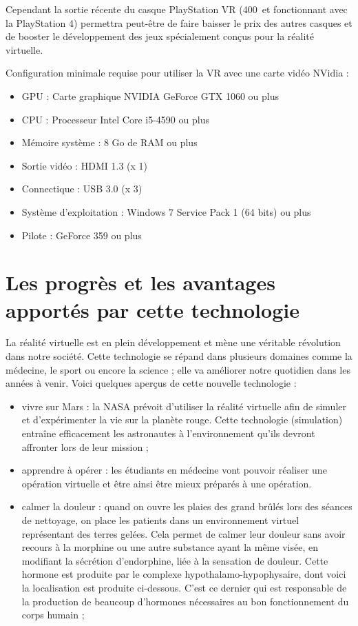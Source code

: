 \documentclass[12pt, a4paper]{report}
\newcommand{\euro}{\,\EUR}
\begin{document}
Cependant la sortie récente du casque PlayStation VR (400 \euro et fonctionnant avec la PlayStation 4) permettra peut-être de faire baisser le prix des autres casques et de booster le développement des jeux spécialement conçus pour la réalité virtuelle.

\vspace{0.5cm}

\noindent Configuration minimale requise pour utiliser la VR avec une carte vidéo NVidia :
\begin{itemize}
\item GPU : Carte graphique NVIDIA GeForce GTX 1060 ou plus
\item CPU : Processeur Intel Core i5-4590 ou plus
\item Mémoire système : 8 Go de RAM ou plus
\item Sortie vidéo : HDMI 1.3 (x 1)
\item Connectique : USB 3.0 (x 3)
\item Système d'exploitation : Windows 7 Service Pack 1 (64 bits) ou plus
\item Pilote : GeForce 359 ou plus
\end{itemize}


\section[Avantages]{Les progrès et les avantages apportés par cette technologie}

La réalité virtuelle est en plein développement et mène une véritable révolution dans notre société. Cette technologie se répand dans plusieurs domaines comme la médecine, le sport ou encore la science ; elle va améliorer notre quotidien dans les années à venir.
Voici quelques aperçus de cette nouvelle technologie :
\begin{itemize}
  \item vivre sur Mars : la NASA prévoit d'utiliser la réalité virtuelle afin de simuler et d'expérimenter la vie sur la planète rouge. Cette technologie (simulation) entraîne efficacement les astronautes à l'environnement qu'ils devront affronter lors de leur mission ;

  \item apprendre à opérer : les étudiants en médecine vont pouvoir réaliser une opération virtuelle et être ainsi être mieux préparés à une opération.

  \item calmer la douleur : quand on ouvre les plaies des grand brûlés lors des séances de nettoyage, on place les patients dans un environnement virtuel représentant des terres gelées. Cela permet de calmer leur douleur sans avoir recours à la morphine ou une autre substance ayant la même visée, en modifiant la sécrétion d'endorphine, liée à la sensation de douleur. Cette hormone est produite par le complexe hypothalamo-hypophysaire, dont voici la localisation est produite ci-dessous. C'est ce dernier qui est responsable de la production de beaucoup d'hormones nécessaires au bon fonctionnement du corps humain ;
\end{itemize}
\end{document}
